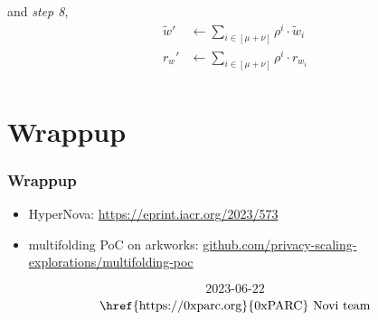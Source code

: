 \documentclass{beamer}
\begin{document}
\begin{tiny}
\begin{frame}
and \emph{step 8},
\begin{align*}
	\widetilde{w}' &\leftarrow \sum_{i \in [\mu+\nu]} \rho^i\cdot \widetilde{w}_i\\
	r_w' &\leftarrow \sum_{i \in [\mu+\nu]} \rho^i \cdot r_{w_i}\\
\end{align*}

\end{frame}

\end{tiny}

\section[Wrappup]{Wrappup}

\begin{frame}
\frametitle{Wrappup}
\begin{itemize}
  \item HyperNova: \href{https://eprint.iacr.org/2023/573}{https://eprint.iacr.org/2023/573}
  \item multifolding PoC on arkworks: \href{https://github.com/privacy-scaling-explorations/multifolding-poc}{github.com/privacy-scaling-explorations/multifolding-poc}
\end{itemize}

\vspace{2cm}
\tiny{
  $$\text{2023-06-22}$$
  $$\text{\href{https://0xparc.org}{0xPARC} Novi team}$$
}
\end{frame}
\end{document}
